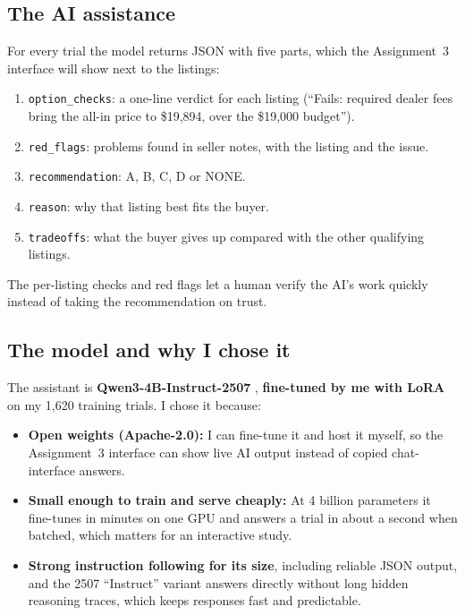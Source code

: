 \documentclass[11pt]{article}
\newcommand{\code}[1]{\texttt{\small #1}}
\begin{document}
\subsection{The AI assistance}\label{sec:assist}

For every trial the model returns JSON with five parts, which the Assignment~3 interface will show
next to the listings:
\begin{enumerate}
  \item \code{option\_checks}: a one-line verdict for each listing (``Fails: required dealer fees
  bring the all-in price to \$19,894, over the \$19,000 budget'').
  \item \code{red\_flags}: problems found in seller notes, with the listing and the issue.
  \item \code{recommendation}: A, B, C, D or NONE.
  \item \code{reason}: why that listing best fits the buyer.
  \item \code{tradeoffs}: what the buyer gives up compared with the other qualifying listings.
\end{enumerate}
The per-listing checks and red flags let a human verify the AI's work quickly instead of taking
the recommendation on trust.

\subsection{The model and why I chose it}

The assistant is \textbf{Qwen3-4B-Instruct-2507} \cite{qwen3}, \textbf{fine-tuned by me with LoRA}
\cite{lora} on my 1,620 training trials. I chose it because:
\begin{itemize}
  \item \textbf{Open weights (Apache-2.0):} I can fine-tune it and host it myself, so the
  Assignment~3 interface can show live AI output instead of copied chat-interface answers.
  \item \textbf{Small enough to train and serve cheaply:} At 4 billion parameters it fine-tunes in
  minutes on one GPU and answers a trial in about a second when batched, which matters for an
  interactive study.
  \item \textbf{Strong instruction following for its size}, including reliable JSON output, and the
  2507 ``Instruct'' variant answers directly without long hidden reasoning traces, which keeps
  responses fast and predictable.
\end{itemize}
\end{document}
